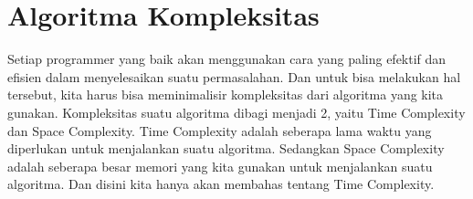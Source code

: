\section{Algoritma Kompleksitas}
Setiap programmer yang baik akan menggunakan cara yang paling efektif dan efisien dalam menyelesaikan suatu permasalahan. Dan untuk bisa melakukan hal tersebut, kita harus bisa meminimalisir kompleksitas dari algoritma yang kita gunakan. Kompleksitas suatu algoritma dibagi menjadi 2, yaitu Time Complexity dan Space Complexity. Time Complexity adalah seberapa lama waktu yang diperlukan untuk menjalankan suatu algoritma. Sedangkan Space Complexity adalah seberapa besar memori yang kita gunakan untuk menjalankan suatu algoritma. Dan disini kita hanya akan membahas tentang Time Complexity.